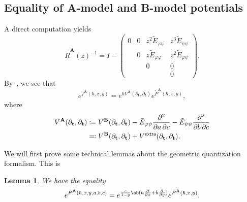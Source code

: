 \documentclass[10pt]{amsart}
\newtheorem{lem}[thm]{Lemma}
\theoremstyle{definition}
\theoremstyle{remark}
\theoremstyle{plain}
\theoremstyle{definition}
\theoremstyle{remark}
\newcommand{\bA}{\mathbf{A}}
\newcommand{\bB}{\mathbf{B}}
\newcommand{\bt}{\mathbf{t}}
\newcommand{\ms}[1]{\mathsf{#1}}
\newcommand{\1}{\mathbf{1}}
\newcommand{\2}{\mathbf{2}}
\newcommand{\3}{\mathbf{3}}
\newcommand{\extra}{\ms{extra}}
\numberwithin{equation}{section}
\begin{document}
\subsection{Equality of A-model and B-model potentials}%
\label{sub:Equality of A-model and B-model potentials}

A direct computation yields
\[ \tilde{R}^{\bA}(z)^{-1} = I - \begin{pmatrix}
    0 & 0 & z^2 \tilde{E}_{\varphi\psi} & z^3 \tilde{E}_{\psi\psi} \\
    & 0 & z \tilde{E}_{\varphi\varphi} & z^2 \tilde{E}_{\varphi\psi} \\
    & & 0 & 0 \\
    & & & 0
\end{pmatrix}.
\]
By~\cite[Proposition 7.3]{virasorofanotoric}, we see that
\[ e^{f^{\bA}(\hbar, x, y)} = e^{\hbar V^{\bA}(\partial_{\bt}, \partial_{\bt})} e^{\tilde{P}^{\bA}(\hbar, x, y)}, \]
where
\begin{align*}
    V^{\bA}(\partial_{\bt}, \partial_{\bt}) &\coloneqq V^{\bB}(\partial_{\bt}, \partial_{\bt}) - \tilde{E}_{\varphi\psi} \pdv{}{a,c} - \tilde{E}_{\psi\psi} \pdv{}{b,c} \\
    &\eqqcolon V^{\bB}(\partial_{\bt}, \partial_{\bt}) + V^{\extra}(\partial_{\bt}, \partial_{\bt}). 
\end{align*}

We will first prove some technical lemmas about the geometric quantization formalism. This is

\begin{lem}
    We have the equality
    \[ e^{\tilde{P}^{\bA}(\hbar, x, y, a, b, c)} = e^{\frac{c}{1-y}\ab(a \pdv{}{x} + b \pdv{}{y})} e^{\tilde{P}^{\bA}(\hbar, x, y)}. \]
\end{lem}
\end{document}
